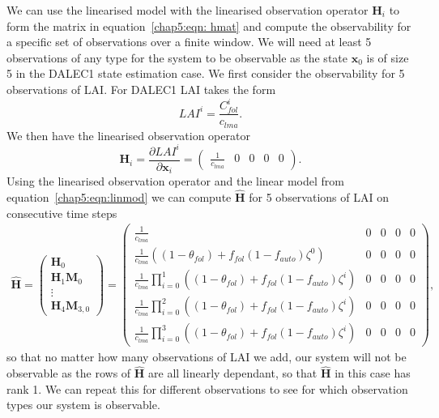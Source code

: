We can use the linearised model with the linearised observation operator $\textbf{H}_{i}$ to form the matrix in equation~\eqref{chap5:eqn: hmat} and compute the observability for a specific set of observations over a finite window. We will need at least 5 observations of any type for the system to be observable as the state $\textbf{x}_0$ is of size 5 in the DALEC1 state estimation case. We first consider the observability for 5 observations of LAI. For DALEC1 LAI takes the form
\begin{equation}
LAI^{i} = \frac{C_{fol}^{i}}{c_{lma}}.
\end{equation}
We then have the linearised observation operator
\begin{equation}
\textbf{H}_{i} = \frac{\partial LAI^{i}}{\partial \textbf{x}_{i}} =
\begin{pmatrix}
\frac{1}{c_{lma}} & 0 & 0 & 0 & 0
\end{pmatrix}.
\end{equation}
Using the linearised observation operator and the linear model from equation~\eqref{chap5:eqn:linmod} we can compute $\hat{\textbf{H}}$ for 5 observations of LAI on consecutive time steps
\begin{multline}
\hat{\mathbf{H}} =
\begin{pmatrix}
\mathbf{H}_0 \\
\mathbf{H}_1\mathbf{M}_0 \\
\vdots \\
\mathbf{H}_{4}\mathbf{M}_{3,0}
\end{pmatrix}
= \begin{pmatrix}
\frac{1}{c_{lma}} & 0 & 0 & 0 & 0 \\
\frac{1}{c_{lma}}((1-\theta_{fol})+f_{fol}(1-f_{auto})\zeta^0) & 0 & 0 & 0 & 0 \\
\frac{1}{c_{lma}}\prod_{i=0}^{1}((1-\theta_{fol})+f_{fol}(1-f_{auto})\zeta^i) & 0 & 0 & 0 & 0 \\
\frac{1}{c_{lma}}\prod_{i=0}^{2}((1-\theta_{fol})+f_{fol}(1-f_{auto})\zeta^i) & 0 & 0 & 0 & 0 \\
\frac{1}{c_{lma}}\prod_{i=0}^{3}((1-\theta_{fol})+f_{fol}(1-f_{auto})\zeta^i) & 0 & 0 & 0 & 0
\end{pmatrix},
\end{multline}
so that no matter how many observations of LAI we add, our system will not be observable as the rows of $\hat{\textbf{H}}$ are all linearly dependant, so that $\hat{\textbf{H}}$ in this case has rank 1. We can repeat this for different observations to see for which observation types our system is observable. 

